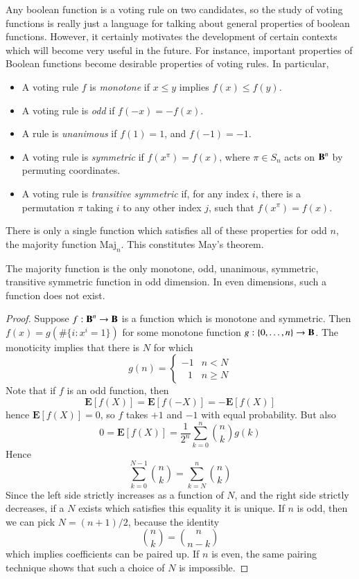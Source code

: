 Any boolean function is a voting rule on two candidates, so the study of voting functions is really just a language for talking about general properties of boolean functions. However, it certainly motivates the development of certain contexts which will become very useful in the future. For instance, important properties of Boolean functions become desirable properties of voting rules. In particular,
%
\begin{itemize}
    \item A voting rule $f$ is \emph{monotone} if $x \leq y$ implies $f(x) \leq f(y)$.
    \item A voting rule is \emph{odd} if $f(-x) = -f(x)$.
    \item A rule is \emph{unanimous} if $f(1) = 1$, and $f(-1) = -1$.
    \item A voting rule is \emph{symmetric} if $f(x^\pi) = f(x)$, where $\pi \in S_n$ acts on $\operatorname{\mathbf{B}}^n$ by permuting coordinates.
    \item A voting rule is \emph{transitive symmetric} if, for any index $i$, there is a permutation $\pi$ taking $i$ to any other index $j$, such that $f(x^\pi) = f(x)$.
\end{itemize}
%
There is only a single function which satisfies all of these properties for odd $n$, the majority function $\text{Maj}_n$. This constitutes May's theorem.

\begin{theorem}
    The majority function is the only monotone, odd, unanimous, symmetric, transitive symmetric function in odd dimension. In even dimensions, such a function does not exist.
\end{theorem}
\begin{proof}
    Suppose $f: \operatorname{\mathbf{B}}^n \to \operatorname{\mathbf{B}}$ is a function which is monotone and symmetric. Then $f(x) = g(\# \{ i : x^i = 1 \})$ for some monotone function $g: \{ 0, \dots, n \} \to \operatorname{\mathbf{B}}$. The monoticity implies that there is $N$ for which
    \[ g(n) = \begin{cases} -1 & n < N \\ \ \ \ 1 & n \geq N \end{cases} \]
    Note that if $f$ is an odd function, then
    \[ \mathbf{E}[f(X)] = \mathbf{E}[f(-X)] = - \mathbf{E}[f(X)] \]
    hence $\mathbf{E}[f(X)] = 0$, so $f$ takes $+1$ and $-1$ with equal probability. But also
    \[ 0 = \mathbf{E}[f(X)] = \frac{1}{2^n} \sum_{k = 0}^n {n \choose k} g(k) \]
    Hence
    \[ \sum_{k = 0}^{N-1} {n \choose k} = \sum_{k = N}^n {n \choose k} \]
    Since the left side strictly increases as a function of $N$, and the right side strictly decreases, if a $N$ exists which satisfies this equality it is unique. If $n$ is odd, then we can pick $N = (n+1)/2$, because the identity
    \[ {n \choose k} = {n \choose n-k} \]
    which implies coefficients can be paired up. If $n$ is even, the same pairing technique shows that such a choice of $N$ is impossible.
\end{proof}

